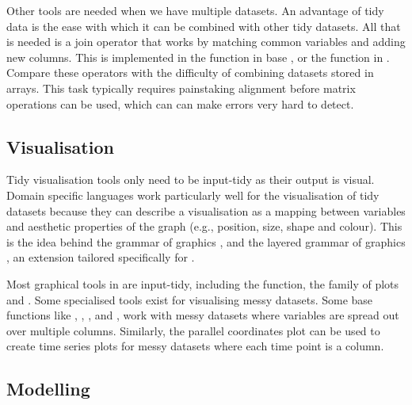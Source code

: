 \documentclass[article]{jss}
\begin{document}

Other tools are needed when we have multiple datasets. An advantage of tidy data is the ease with which it can be combined with other tidy datasets. All that is needed is a join operator that works by matching common variables and adding new columns. This is implemented in the  function in base , or the  function in . Compare these operators with the difficulty of combining datasets stored in arrays. This task typically requires painstaking alignment before matrix operations can be used, which can can make errors very hard to detect.

\subsection{Visualisation}

Tidy visualisation tools only need to be input-tidy as their output is visual. Domain specific languages work particularly well for the visualisation of tidy datasets because they can describe a visualisation as a mapping between variables and aesthetic properties of the graph (e.g., position, size, shape and colour). This is the idea behind the grammar of graphics \citep{wilkinson:2006}, and the layered grammar of graphics \citep{wickham:2007d}, an extension tailored specifically for .

Most graphical tools in  are input-tidy, including the   function, the  family of plots \citep{sarkar:2008} and  \citep{me:ggplot2}. Some specialised tools exist for visualising messy datasets. Some base  functions like , , , and , work with messy datasets where variables are spread out over multiple columns. Similarly, the parallel coordinates plot \citep{wegman:1990,inselberg:1985} can be used to create time series plots for messy datasets where each time point is a column.

\subsection{Modelling}
\label{sub:modelling}
\end{document}
